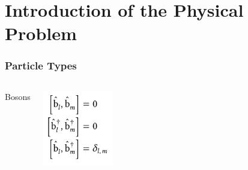 \section{Introduction of the Physical Problem}
    \begin{frame}[t]
        \frametitle{Particle Types}
        
        \begin{columns}[t]
                \begin{wideitemize}
                    \item Bosons
                    \item[\phantom{\textbullet}] \phantom{Invisible item}
                    \item[\phantom{\textbullet}] \phantom{Invisible item}
                    \item[\phantom{\textbullet}] \phantom{Invisible item}
                \end{wideitemize}
    
                \includegraphics[width=0.7\textwidth]{./main-content/introduction/bosonic-operators.pdf}
    
        \end{columns}

        \onslide %
    \end{frame}
